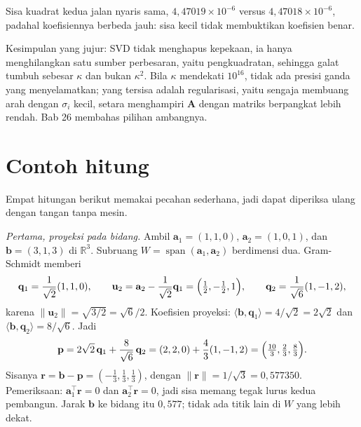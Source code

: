 Sisa kuadrat kedua jalan nyaris sama, $4{,}47019\times10^{-6}$ versus
$4{,}47018\times10^{-6}$, padahal koefisiennya berbeda jauh: sisa kecil tidak membuktikan
koefisien benar.

Kesimpulan yang jujur: SVD tidak menghapus kepekaan, ia hanya menghilangkan satu sumber
perbesaran, yaitu pengkuadratan, sehingga galat tumbuh sebesar $\kappa$ dan bukan
$\kappa^{2}$. Bila $\kappa$ mendekati $10^{16}$, tidak ada presisi ganda yang
menyelamatkan; yang tersisa adalah regularisasi, yaitu sengaja membuang arah dengan
$\sigma_{i}$ kecil, setara menghampiri $\mathbf{A}$ dengan matriks berpangkat lebih
rendah. Bab 26 membahas pilihan ambangnya.

\section{Contoh hitung}

Empat hitungan berikut memakai pecahan sederhana, jadi dapat diperiksa ulang dengan
tangan tanpa mesin.

\emph{Pertama, proyeksi pada bidang.} Ambil
$\mathbf{a}_{1}=(1,1,0)$, $\mathbf{a}_{2}=(1,0,1)$, dan $\mathbf{b}=(3,1,3)$ di
$\mathbb{R}^{3}$. Subruang $W=\operatorname{span}(\mathbf{a}_{1},\mathbf{a}_{2})$
berdimensi dua. Gram-Schmidt memberi
\[
  \mathbf{q}_{1}=\frac{1}{\sqrt{2}}(1,1,0),\qquad
  \mathbf{u}_{2}=\mathbf{a}_{2}-\frac{1}{\sqrt{2}}\mathbf{q}_{1}
  =\Bigl(\tfrac12,-\tfrac12,1\Bigr),\qquad
  \mathbf{q}_{2}=\frac{1}{\sqrt{6}}(1,-1,2),
\]
karena $\|\mathbf{u}_{2}\|=\sqrt{3/2}=\sqrt{6}/2$. Koefisien proyeksi:
$\langle\mathbf{b},\mathbf{q}_{1}\rangle=4/\sqrt{2}=2\sqrt{2}$ dan
$\langle\mathbf{b},\mathbf{q}_{2}\rangle=8/\sqrt{6}$. Jadi
\[
  \mathbf{p}=2\sqrt{2}\,\mathbf{q}_{1}+\frac{8}{\sqrt{6}}\,\mathbf{q}_{2}
  =(2,2,0)+\frac{4}{3}(1,-1,2)
  =\Bigl(\tfrac{10}{3},\tfrac23,\tfrac83\Bigr).
\]
Sisanya $\mathbf{r}=\mathbf{b}-\mathbf{p}=(-\tfrac13,\tfrac13,\tfrac13)$, dengan
$\|\mathbf{r}\|=1/\sqrt{3}=0{,}577350$. Pemeriksaan: $\mathbf{a}_{1}^{\top}\mathbf{r}=0$
dan $\mathbf{a}_{2}^{\top}\mathbf{r}=0$, jadi sisa memang tegak lurus kedua pembangun.
Jarak $\mathbf{b}$ ke bidang itu $0{,}577$; tidak ada titik lain di $W$ yang lebih dekat.

